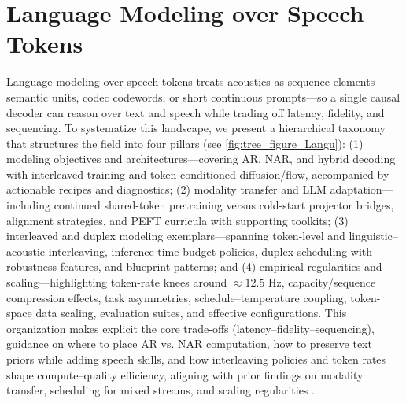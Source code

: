 \documentclass{article}
\begin{document}
\section{Language Modeling over Speech Tokens} \label{sec:Language Modeling over Speech Tokens}
Language modeling over speech tokens treats acoustics as sequence elements—semantic units, codec codewords, or short continuous prompts—so a single causal decoder can reason over text and speech while trading off latency, fidelity, and sequencing. To systematize this landscape, we present a hierarchical taxonomy that structures the field into four pillars (see \autoref{fig:tree_figure_Langu}): (1) modeling objectives and architectures—covering AR, NAR, and hybrid decoding with interleaved training and token-conditioned diffusion/flow, accompanied by actionable recipes and diagnostics; (2) modality transfer and LLM adaptation—including continued shared-token pretraining versus cold-start projector bridges, alignment strategies, and PEFT curricula with supporting toolkits; (3) interleaved and duplex modeling exemplars—spanning token-level and linguistic–acoustic interleaving, inference-time budget policies, duplex scheduling with robustness features, and blueprint patterns; and (4) empirical regularities and scaling—highlighting token-rate knees around $\approx 12.5$ Hz, capacity/sequence compression effects, task asymmetries, schedule–temperature coupling, token-space data scaling, evaluation suites, and effective configurations. This organization makes explicit the core trade-offs (latency–fidelity–sequencing), guidance on where to place AR vs. NAR computation, how to preserve text priors while adding speech skills, and how interleaving policies and token rates shape compute–quality efficiency, aligning with prior findings on modality transfer, scheduling for mixed streams, and scaling regularities \cite{zeng2024scalingspeechtextpretrainingsyntheticint,wang2025tadicodectextawarediffusionspeechtokeniz}.

\end{document}
